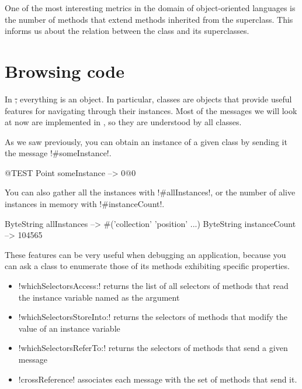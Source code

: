 \documentclass[a4paper,10pt,twoside]{book}
\begin{document}
One of the most interesting metrics in the domain of object-oriented languages is the number of methods that extend methods inherited from the superclass.
This informs us about the relation between the class and its superclasses.

\section{Browsing code}

In \st, everything is an object. In particular, classes are objects that provide useful features for navigating through their instances.
Most of the messages we will look at now are implemented in , so they are understood by all classes.

As we saw previously, you can obtain an instance of a given class by sending it the message \ct!#someInstance!.

\begin{code}{@TEST} %
Point someInstance --> 0@0
\end{code}

You can also gather all the instances with \ct!#allInstances!, or the number of alive instances in memory with \ct!#instanceCount!.

\begin{code}{} %
ByteString allInstances     --> #('collection' 'position'  ...)
ByteString instanceCount --> 104565
\end{code}

These features can be very useful when debugging an application, because you can ask a class to enumerate those of its methods exhibiting specific properties.
\begin{itemize}
\item \ct!whichSelectorsAccess:! returns the list of all selectors of methods that read the instance variable named as the argument
\item \ct!whichSelectorsStoreInto:! returns the selectors of methods that modify the value of an instance variable
\item \ct!whichSelectorsReferTo:! returns the selectors of methods that send a given message
\item \ct!crossReference! associates each message with the set of methods that send it.
\end{itemize}

\end{document}
